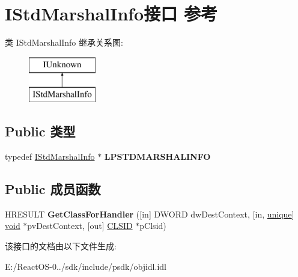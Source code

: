 \hypertarget{interface_i_std_marshal_info}{}\section{I\+Std\+Marshal\+Info接口 参考}
\label{interface_i_std_marshal_info}
类 I\+Std\+Marshal\+Info 继承关系图\+:\begin{figure}[H]
\begin{center}
\leavevmode
\includegraphics[height=2.000000cm]{interface_i_std_marshal_info}
\end{center}
\end{figure}
\subsection*{Public 类型}
\begin{DoxyCompactItemize}
\item 
\mbox{\label{interface_i_std_marshal_info_a3e6aa3de6aba82625dfef02d57514cc9}} 
typedef \hyperlink{interface_i_std_marshal_info}{I\+Std\+Marshal\+Info} $\ast$ {\bfseries L\+P\+S\+T\+D\+M\+A\+R\+S\+H\+A\+L\+I\+N\+FO}
\end{DoxyCompactItemize}
\subsection*{Public 成员函数}
\begin{DoxyCompactItemize}
\item 
\mbox{\label{interface_i_std_marshal_info_a245f47ea6efbd2efea54c2901e56daf8}} 
H\+R\+E\+S\+U\+LT {\bfseries Get\+Class\+For\+Handler} (\mbox{[}in\mbox{]} D\+W\+O\+RD dw\+Dest\+Context, \mbox{[}in, \hyperlink{interfaceunique}{unique}\mbox{]} \hyperlink{interfacevoid}{void} $\ast$pv\+Dest\+Context, \mbox{[}out\mbox{]} \hyperlink{struct___i_i_d}{C\+L\+S\+ID} $\ast$p\+Clsid)
\end{DoxyCompactItemize}


该接口的文档由以下文件生成\+:\begin{DoxyCompactItemize}
\item 
E\+:/\+React\+O\+S-\/0../sdk/include/psdk/objidl.\+idl\end{DoxyCompactItemize}
